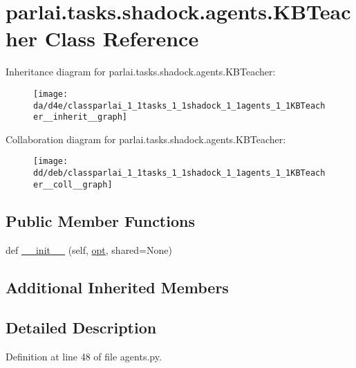 \hypertarget{classparlai_1_1tasks_1_1shadock_1_1agents_1_1KBTeacher}{}\section{parlai.\+tasks.\+shadock.\+agents.\+K\+B\+Teacher Class Reference}
\label{classparlai_1_1tasks_1_1shadock_1_1agents_1_1KBTeacher}


Inheritance diagram for parlai.\+tasks.\+shadock.\+agents.\+K\+B\+Teacher\+:\nopagebreak
\begin{figure}[H]
\begin{center}
\leavevmode
\texttt{[image: da/d4e/classparlai\_1\_1tasks\_1\_1shadock\_1\_1agents\_1\_1KBTeacher\_\_inherit\_\_graph]}
\end{center}
\end{figure}


Collaboration diagram for parlai.\+tasks.\+shadock.\+agents.\+K\+B\+Teacher\+:\nopagebreak
\begin{figure}[H]
\begin{center}
\leavevmode
\texttt{[image: dd/deb/classparlai\_1\_1tasks\_1\_1shadock\_1\_1agents\_1\_1KBTeacher\_\_coll\_\_graph]}
\end{center}
\end{figure}
\subsection*{Public Member Functions}
\begin{DoxyCompactItemize}
\item 
def \hyperlink{classparlai_1_1tasks_1_1shadock_1_1agents_1_1KBTeacher_a4d1a61f6ca5d3aeea18b629573ea382e}{\+\_\+\+\_\+init\+\_\+\+\_\+} (self, \hyperlink{classparlai_1_1core_1_1teachers_1_1FbDialogTeacher_af7a9ec497b9cd0292d7b8fa220da7c28}{opt}, shared=None)
\end{DoxyCompactItemize}
\subsection*{Additional Inherited Members}


\subsection{Detailed Description}


Definition at line 48 of file agents.\+py.



